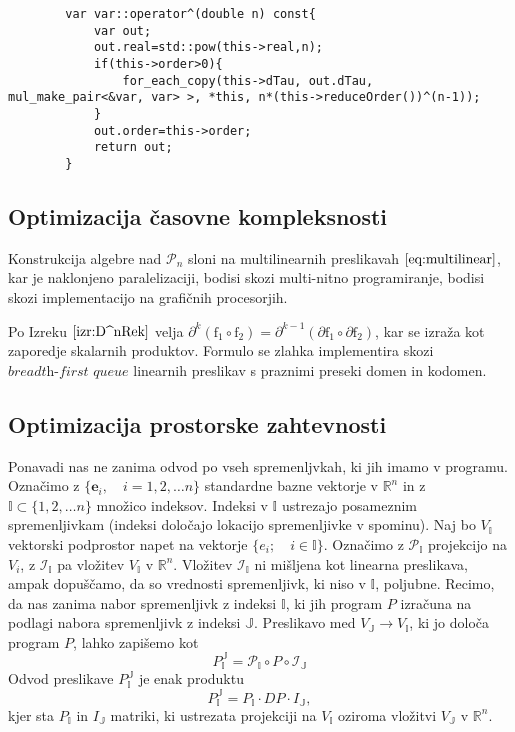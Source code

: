 \documentclass{article}
\newcommand{\RR}{\mathbb{R}}
\newcommand{\II}{\mathbb{I}}
\newcommand{\JJ}{\mathbb{J}}
\newcommand{\e}{\mathbf{e}}
\newcommand{\dP}{\mathcal{P}}
\newcommand{\D}{\partial}
\begin{document}
      \begin{lstlisting}
        var var::operator^(double n) const{
            var out;
            out.real=std::pow(this->real,n);
            if(this->order>0){
            	for_each_copy(this->dTau, out.dTau, mul_make_pair<&var, var> >, *this, n*(this->reduceOrder())^(n-1));
            }
            out.order=this->order;
            return out;
        }
        \end{lstlisting}
        
\subsection{Optimizacija časovne kompleksnosti}

Konstrukcija algebre nad $\dP_n$ sloni na multilinearnih preslikavah $\eqref{eq:multilinear}$, kar je naklonjeno paralelizaciji, bodisi skozi multi-nitno programiranje, bodisi skozi implementacijo na grafičnih procesorjih.

Po Izreku $\ref{izr:D^nRek}$ velja  $\D^k(\mathrm{f_1}\circ \mathrm{f_2})=\D^{k-1}(\D \mathrm{f_1}\circ\D \mathrm{f_2})$, kar se izraža kot zaporedje skalarnih produktov. Formulo se zlahka implementira skozi $\textit{breadth-first queue}$ linearnih preslikav s praznimi preseki domen in kodomen.   

\subsection{Optimizacija prostorske zahtevnosti}
 Ponavadi nas ne zanima odvod po vseh spremenljvkah, ki jih imamo v programu.
 Označimo z $\{\e_i,\quad i=1,2,\ldots n\}$ standardne bazne vektorje v $\RR^n$ in z
 $\II\subset\{1,2,\ldots n\}$ množico indeksov. Indeksi v $\II$ ustrezajo
 posameznim spremenljivkam (indeksi določajo lokacijo spremenljivke v spominu). Naj bo $V_\II$ vektorski
 podprostor napet na vektorje $\{e_i;\quad i\in\II\}$. Označimo z 
 $\mathcal{P}_\II$ projekcijo na $V_i$, z $\mathcal{I}_\II$ pa vložitev $V_\II$ v
 $\RR^n$. Vložitev $\mathcal{I}_\II$ ni mišljena kot linearna preslikava, ampak
 dopuščamo, da so vrednosti spremenljivk, ki niso v $\II$, poljubne. Recimo, da nas zanima nabor spremenljivk z indeksi $\II$, ki jih
 program $P$ izračuna na podlagi nabora spremenljivk z indeksi $\mathbb{J}$.
 Preslikavo med $V_\JJ\to V_\II$, ki jo določa program $P$, lahko zapišemo kot
 \begin{equation}
   \label{eq:zozitev}
   P^{\JJ}_{\II}=\mathcal{P}_\II\circ P\circ \mathcal{I}_\JJ 
 \end{equation}
 Odvod preslikave $ P^{\JJ}_{\II}$ je enak produktu
 \begin{equation*}
   P^{\JJ}_{\II}=P_\II\cdot DP\cdot I_\JJ,   
 \end{equation*}
 kjer sta $P_\II$ in  $I_\JJ$ matriki, ki ustrezata projekciji na $V_\II$ oziroma
 vložitvi $V_\JJ$ v $\RR^n$.  
 
\end{document}
